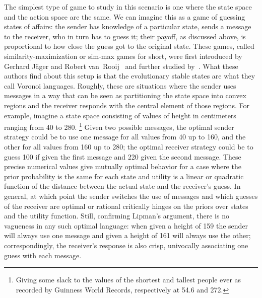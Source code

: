 \documentclass[a4paper]{article}
\begin{document}
The simplest type of game to study in this scenario is one where the state space and the action space are the same. 
We can imagine this as a game of guessing states of affairs: the sender has knowledge of a particular state, sends a message to the receiver, who in turn has to guess it; their payoff, as discussed above, is proportional to how close the guess got to the original state.
These games, called similarity-maximization or sim-max games for short, were first introduced by Gerhard J{\"a}ger and Robert van~Rooij~\parencite{jager_language_2007,Jager2007} and further studied by~\textcite{jager_voronoi_2011}.
What these authors find about this setup is that the evolutionary stable states are what they call Voronoi languages.
Roughly, these are situations where the sender uses messages in a way that can be seen as partitioning the state space into convex regions and the receiver responds with the central element of those regions.
For example, imagine a state space consisting of values of height in centimeters ranging from 40 to 280.%
\footnote{Giving some slack to the values of the shortest and tallest people ever as recorded by Guinness World Records, respectively at 54.6 and 272.}
Given two possible messages, the optimal sender strategy could be to use one message for all values from 40 up to 160, and the other for all values from 160 up to 280; the optimal receiver strategy could be to guess 100 if given the first message and 220 given the second message.
These precise numerical values give mutually optimal behavior for a case where the prior probability is the same for each state and utility is a linear or quadratic function of the distance between the actual state and the receiver's guess.
In general, at which point the sender switches the use of messages and which guesses of the receiver are optimal or rational critically hinges on the priors over states and the utility function.
Still, confirming Lipman's argument, there is no vagueness in any such optimal language: when given a height of 159 the sender will always use one message and given a height of 161 will always use the other; correspondingly, the receiver's response is also crisp, univocally associating one guess with each message.
\end{document}
